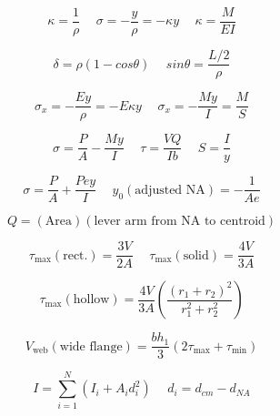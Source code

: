 \documentclass[twocolumn, 12pt]{article}
\begin{document}
{\begin{equation*}
    \kappa = \frac{1}{\rho} \hspace{15pt} \sigma =-\frac{y}{\rho}=- \kappa y \hspace{15pt} \kappa = \frac{M}{EI}
\end{equation*}

\begin{equation*}
    \delta = \rho (1-cos\theta) \hspace{15pt} sin\theta = \frac{L/2}{\rho} 
\end{equation*}

\begin{equation*}
    \sigma_x = -\frac{Ey}{\rho} = -E \kappa y \hspace{15pt} \sigma_x = -\frac{My}{I} = \frac{M}{S}
\end{equation*}

\begin{equation*}
    \sigma = \frac{P}{A} - \frac{My}{I} \hspace{15pt} \tau = \frac{VQ}{Ib} \hspace{15pt} S=\frac{I}{y}
\end{equation*}

\begin{equation*}
    \sigma = \frac{P}{A}+\frac{Pey}{I} \hspace{15pt} y_0(\text{adjusted NA})=-\frac{1}{Ae}
\end{equation*}

\begin{equation*}
    Q = (\text{Area})(\text{lever arm from NA to centroid})
\end{equation*}

\begin{equation*}
    \tau _{\text{max}}(\text{rect.})  = \frac{3V}{2A} \hspace{15pt} \tau_{\text{max}}(\text{solid}) = \frac{4V}{3A}
\end{equation*}

\begin{equation*}
    \tau_{\text{max}}(\text{hollow}) = \frac{4V}{3A}\left(\frac{(r_1+r_2)^2} {r_1^2 + r_2^2}\right)
\end{equation*}

\begin{equation*}
    V_{\text{web}}(\text{wide flange}) = \frac{bh_1}{3} (2\tau_{\text{max}}+\tau_{\text{min}}) 
\end{equation*}

\begin{equation*}
    I=\sum_{i=1}^N(I_i+A_id_i^2) \hspace{15pt} d_i=d_{cm}-d_{NA}
\end{equation*}

}
\end{document}
